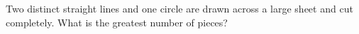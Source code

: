 Two distinct straight lines and one circle are drawn across a large sheet and cut completely. What is the greatest number of pieces?
